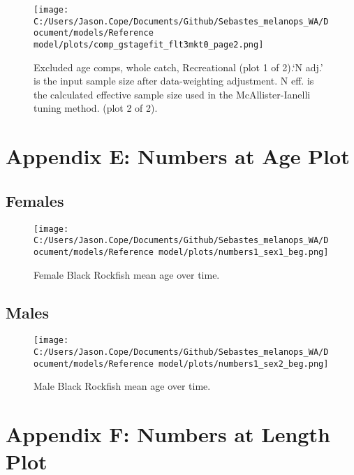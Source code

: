 \documentclass[11pt,
  english,
  letterpaper,
]{article}
\begin{document}
\begin{figure}
\centering
\texttt{[image: C:/Users/Jason.Cope/Documents/Github/Sebastes\_melanops\_WA/Document/models/Reference model/plots/comp\_gstagefit\_flt3mkt0\_page2.png]}
\caption{Excluded age comps, whole catch, Recreational (plot 1 of 2).`N adj.' is the input sample size after data-weighting adjustment. N eff. is the calculated effective sample size used in the McAllister-Ianelli tuning method. (plot 2 of 2).\label{fig:comp_gstagefit_flt3mkt0_page2}}
\end{figure}

\clearpage

\hypertarget{app-e}{%
\section{Appendix E: Numbers at Age Plot}\label{app-e}}

\hypertarget{females}{%
\subsection{Females}\label{females}}

\begin{figure}
\centering
\texttt{[image: C:/Users/Jason.Cope/Documents/Github/Sebastes\_melanops\_WA/Document/models/Reference model/plots/numbers1\_sex1\_beg.png]}
\caption{Female Black Rockfish mean age over time.\label{fig:num_age_females}}
\end{figure}

\hypertarget{males}{%
\subsection{Males}\label{males}}

\begin{figure}
\centering
\texttt{[image: C:/Users/Jason.Cope/Documents/Github/Sebastes\_melanops\_WA/Document/models/Reference model/plots/numbers1\_sex2\_beg.png]}
\caption{Male Black Rockfish mean age over time.\label{fig:num_age_males}}
\end{figure}

\clearpage

\hypertarget{app-f}{%
\section{Appendix F: Numbers at Length Plot}\label{app-f}}
\end{document}
